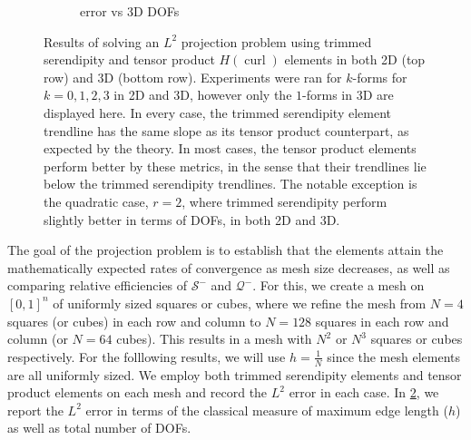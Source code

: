 \documentclass[format=acmsmall,screen,timestamp=false,a4paper]{acmart}
\DeclareMathOperator{\curl}{curl}
\newcommand{\hcurl}{\ensuremath{{H}(\curl)}\xspace}
\begin{document}
\begin{figure}[htbp]
\begin{subfigure}[h]{0.48\textwidth}
    \caption{error vs 3D DOFs\label{fig:3dProjectionDofs}}
  \end{subfigure}
  \caption{Results of solving an $L^2$ projection problem using trimmed serendipity and tensor product \hcurl elements in both 2D (top row) and 3D (bottom row).  Experiments were ran for $k$-forms for $k=0,1,2,3$ in 2D and 3D, however only the $1$-forms in 3D are displayed here.  In every case, the trimmed serendipity element trendline has the same slope as its tensor product counterpart, as expected by the theory.  In most cases, the tensor product elements perform better by these metrics, in the sense that their trendlines lie below the trimmed serendipity trendlines.  The notable exception is the quadratic case, $r=2$, where trimmed serendipity perform slightly better in terms of DOFs, in both 2D and 3D.\label{Projections}} 
\end{figure}

The goal of the projection problem is to establish that the elements attain the mathematically expected rates of convergence as mesh size decreases, as well as comparing relative efficiencies of $\mathcal{S}^-$ and $\mathcal{Q}^-$.  For this, we create a mesh on $[0,1]^n$ of uniformly sized squares or cubes, where we refine the mesh from $N=4$ squares (or cubes) in each row and column to $N=128$ squares in each row and column (or $N=64$ cubes).  This results in a mesh with $N^2$ or $N^3$ squares or cubes respectively.  For the folllowing results, we will use $h = \frac{1}{N}$ since the mesh elements are all uniformly sized. 
We employ both trimmed serendipity elements and tensor product elements on each mesh and record the $L^2$ error in each case.  In \cref{Projections}, we report the $L^2$ error in terms of the classical measure of maximum edge length ($h$) as well as total number of  DOFs.
\end{document}
